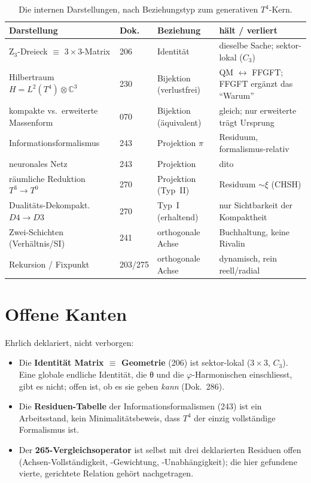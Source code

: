 \begin{table}[htbp]
\centering
\caption{Die internen Darstellungen, nach Beziehungstyp zum generativen $T^4$-Kern.}
\label{tab:karte}
\begin{tabular}{p{4.2cm}p{1.4cm}p{3.0cm}p{4.0cm}}
\toprule
\textbf{Darstellung} & \textbf{Dok.} & \textbf{Beziehung} & \textbf{hält / verliert} \\
\midrule
Z$_3$-Dreieck $\equiv$ $3\times3$-Matrix & 206 & Identität & dieselbe Sache; sektor-lokal ($C_3$) \\
\addlinespace
Hilbertraum $H=L^2(T^4)\otimes\mathbb{C}^3$ & 230 & Bijektion (verlustfrei) & QM $\leftrightarrow$ FFGFT; FFGFT ergänzt das \enquote{Warum} \\
\addlinespace
kompakte vs.\ erweiterte Massenform & 070 & Bijektion (äquivalent) & gleich; nur erweiterte trägt Ursprung \\
\addlinespace
Informationsformalismus & 243 & Projektion $\pi$ & Residuum, formalismus-relativ \\
\addlinespace
neuronales Netz & 243 & Projektion & dito \\
\addlinespace
räumliche Reduktion $T^3\!\to\!T^0$ & 270 & Projektion (Typ~II) & Residuum $\sim\xi$ (CHSH) \\
\midrule
Dualitäts-Dekompakt.\ $D4\!\to\!D3$ & 270 & Typ~I (erhaltend) & nur Sichtbarkeit der Kompaktheit \\
\addlinespace
Zwei-Schichten (Verhältnis/SI) & 241 & orthogonale Achse & Buchhaltung, keine Rivalin \\
\addlinespace
Rekursion / Fixpunkt & 203/275 & orthogonale Achse & dynamisch, rein reell/radial \\
\bottomrule
\end{tabular}
\end{table}

\section{Offene Kanten}
Ehrlich deklariert, nicht verborgen:
\begin{itemize}
  \item Die \textbf{Identität Matrix $\equiv$ Geometrie} (206) ist sektor-lokal ($3\times3$, $C_3$).
        Eine globale endliche Identität, die θ und die $\varphi$-Harmonischen einschliesst, gibt es
        nicht; offen ist, ob es sie geben \emph{kann} (Dok.~286).
  \item Die \textbf{Residuen-Tabelle} der Informationsformalismen (243) ist ein Arbeitsstand, kein
        Minimalitätsbeweis, dass $T^4$ der einzig vollständige Formalismus ist.
  \item Der \textbf{265-Vergleichsoperator} ist selbst mit drei deklarierten Residuen offen
        (Achsen-Vollständigkeit, -Gewichtung, -Unabhängigkeit); die hier gefundene vierte,
        gerichtete Relation gehört nachgetragen.
\end{itemize}

